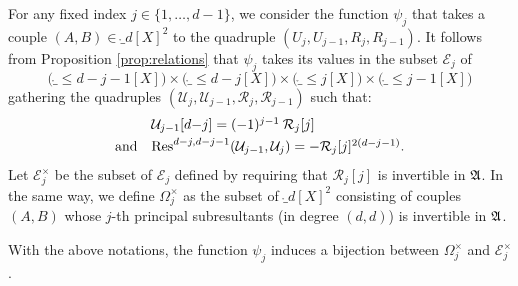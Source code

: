 \documentclass{article}
\begin{document}
For any fixed index $j \in \{1, \ldots, d-1\}$, we consider the 
function $\psi_j$ that takes a couple $(A,B) \in \ring_d[X]^2$ to the
quadruple $(U_j, U_{j-1}, R_j, R_{j-1})$. It follows from Proposition
\ref{prop:relations} that $\psi_j$ takes its values in the subset 
$\mathcal E_j$ of
$$\big(\ring_{\leq d-j-1}[X]\big) \times \big(\ring_{\leq d-j}[X]\big) \times 
\big(\ring_{\leq j}[X]\big) \times \big(\ring_{\leq j-1}[X]\big)$$
gathering the quadruples $(\mathcal U_j, \mathcal U_{j-1}, \mathcal
R_j, \mathcal R_{j-1})$ such that:
$$\begin{array}{ll}
&\mathcal U_{j-1}[d{-}j] = (-1)^{j-1} \: \mathcal R_j[j] \smallskip \\
\text{and} &
\Res^{d-j,d-j-1}(\mathcal U_{j-1}, \mathcal U_j) = -\mathcal R_j[j]^{2(d-j-1)}.
\end{array}$$
Let $\mathcal E_j^\times$ be the subset of $\mathcal E_j$ defined by 
requiring that $\mathcal R_j[j]$ is invertible in $\mathfrak A$. In the same 
way, we define $\Omega_j^\times$ as the subset of $\ring_d[X]^2$ 
consisting of couples $(A,B)$ whose $j$-th principal subresultants (in 
degree $(d,d)$) is invertible in $\mathfrak A$.

\begin{prop}
\label{prop:bijection}
With the above notations, the function $\psi_j$ induces a bijection between
$\Omega_j^\times$ and $\mathcal E_j^\times$.
\end{prop}
\end{document}
